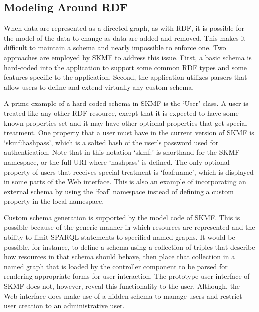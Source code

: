 \subsection{Modeling Around RDF}
\label{method:orm}

When data are represented as a directed graph, as with RDF, it is possible for the model of the data to change as data are added and removed. This makes it difficult to maintain a schema and nearly impossible to enforce one. Two approaches are employed by SKMF to address this issue. First, a basic schema is hard-coded into the application to support some common RDF types and some features specific to the application. Second, the application utilizes parsers that allow users to define and extend virtually any custom schema.

A prime example of a hard-coded schema in SKMF is the `User' class. A user is treated like any other RDF resource, except that it is expected to have some known properties set and it may have other optional properties that get special treatment. One property that a user must have in the current version of SKMF is `skmf:hashpass', which is a salted hash of the user's password used for authentication. Note that in this notation `skmf:' is shorthand for the SKMF namespace, or the full URI where `hashpass' is defined. The only optional property of users that receives special treatment is `foaf:name', which is displayed in some parts of the Web interface. This is also an example of incorporating an external schema by using the `foaf' namespace
\cite{foaf}
instead of defining a custom property in the local namespace.

Custom schema generation is supported by the model code of SKMF. This is possible because of the generic manner in which resources are represented and the ability to limit SPARQL statements to specified named graphs. It would be possible, for instance, to define a schema using a collection of triples that describe how resources in that schema should behave, then place that collection in a named graph that is loaded by the controller component to be parsed for rendering appropriate forms for user interaction. The prototype user interface of SKMF does not, however, reveal this functionality to the user. Although, the Web interface does make use of a hidden schema to manage users and restrict user creation to an administrative user.

